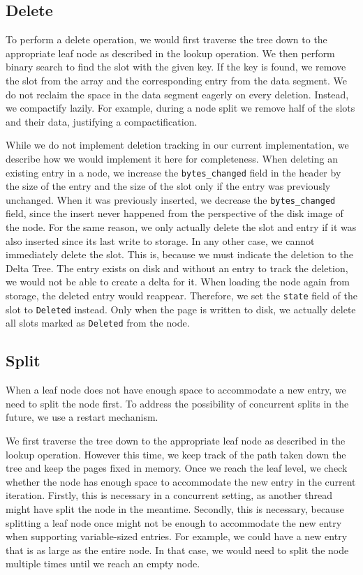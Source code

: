 \subsection*{Delete}
\label{subsec:delete}
To perform a delete operation, we would first traverse the tree down to the appropriate leaf node as described in the lookup operation.
We then perform binary search to find the slot with the given key.
If the key is found, we remove the slot from the array and the corresponding entry from the data segment.
We do not reclaim the space in the data segment eagerly on every deletion.
Instead, we compactify lazily. 
For example, during a node split we remove half of the slots and their data, justifying a compactification.

While we do not implement deletion tracking in our current implementation, we describe how we would implement it here for completeness.
When deleting an existing entry in a node, we increase the \texttt{bytes\_changed} field in the header by the size of the entry and the size of the slot only if the entry was previously unchanged.
When it was previously inserted, we decrease the \texttt{bytes\_changed} field, since the insert never happened from the perspective of the disk image of the node.
For the same reason, we only actually delete the slot and entry if it was also inserted since its last write to storage.
In any other case, we cannot immediately delete the slot.
This is, because we must indicate the deletion to the Delta Tree.
The entry exists on disk and without an entry to track the deletion, we would not be able to create a delta for it.
When loading the node again from storage, the deleted entry would reappear.
Therefore, we set the \texttt{state} field of the slot to \texttt{Deleted} instead.
Only when the page is written to disk, we actually delete all slots marked as \texttt{Deleted} from the node.

\subsection*{Split}
\label{subsec:split}
When a leaf node does not have enough space to accommodate a new entry, we need to split the node first.
To address the possibility of concurrent splits in the future, we use a restart mechanism.

We first traverse the tree down to the appropriate leaf node as described in the lookup operation.
However this time, we keep track of the path taken down the tree and keep the pages fixed in memory.
Once we reach the leaf level, we check whether the node has enough space to accommodate the new entry in the current iteration.
Firstly, this is necessary in a concurrent setting, as another thread might have split the node in the meantime.
Secondly, this is necessary, because splitting a leaf node once might not be enough to accommodate the new entry when supporting variable-sized entries.
For example, we could have a new entry that is as large as the entire node.
In that case, we would need to split the node multiple times until we reach an empty node.

